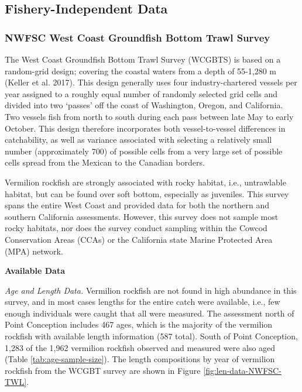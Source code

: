\documentclass[11pt,
  english,
]{article}
\begin{document}
\tagstructend


\hypertarget{fishery-independent-data}{%
\subsection{Fishery-Independent Data}\label{fishery-independent-data}}

\leavevmode\tagmcend\tagstructend


\hypertarget{nwfsc-west-coast-groundfish-bottom-trawl-survey}{%
\subsubsection{NWFSC West Coast Groundfish Bottom Trawl Survey}\label{nwfsc-west-coast-groundfish-bottom-trawl-survey}}

\leavevmode\tagmcend\tagstructend

The West Coast Groundfish Bottom Trawl Survey (WCGBTS) is based on a random-grid design; covering the coastal waters from a depth of 55-1,280 m {(Keller et al. 2017)\leavevmode\tagmcend\tagstructend}. This design generally uses four industry-chartered vessels per year assigned to a roughly equal number of randomly selected grid cells and divided into two `passes' off the coast of Washington, Oregon, and California. Two vessels fish from north to south during each pass between late May to early October. This design therefore incorporates both vessel-to-vessel differences in catchability, as well as variance associated with selecting a relatively small number (approximately 700) of possible cells from a very large set of possible cells spread from the Mexican to the Canadian borders.

Vermilion rockfish are strongly associated with rocky habitat, i.e., untrawlable habitat, but can be found over soft bottom, especially as juveniles. This survey spans the entire West Coast and provided data for both the northern and southern California assessments. However, this survey does not sample most rocky habitats, nor does the survey conduct sampling within the Cowcod Conservation Areas (CCAs) or the California state Marine Protected Area (MPA) network.

\textbf{Available Data}

\emph{Age and Length Data.} Vermilion rockfish are not found in high abundance in this survey, and in most cases lengths for the entire catch were available, i.e., few enough individuals were caught that all were measured. The assessment north of Point Conception includes 467 ages, which is the majority of the vermilion rockfish with available length information (587 total). South of Point Conception, 1,283 of the 1,962 vermilion rockfish observed and measured were also aged (Table \ref{tab:age-sample-size}). The length compositions by year of vermilion rockfish from the WCGBT survey are shown in Figure \ref{fig:len-data-NWFSC-TWL}.
\end{document}
